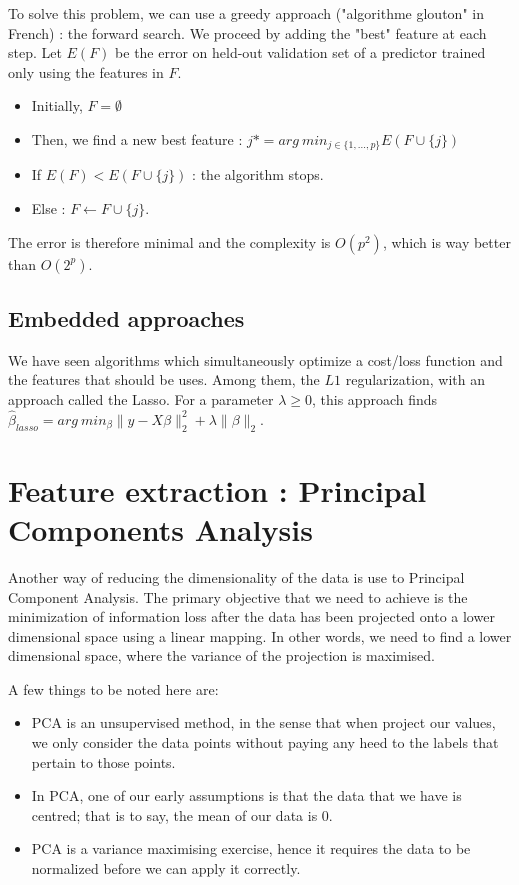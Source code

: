 \documentclass{article}
\begin{document}
To solve this problem, we can use a greedy approach ("algorithme glouton" in French) : the forward search.
We proceed  by adding the "best" feature at each step. Let $E(F)$ be the error on held-out validation set of a predictor trained only using the features in $F$.
\begin{itemize}

    \item Initially, $F = \emptyset $
    
    \item Then, we find a new best feature : $j*= arg \ min_{j \in \{1,...,p\}} E(F\cup \{j\})$
    
    \item If $E(F)<E(F \cup \{j\})$ : the algorithm stops.
    
    \item Else : $F \leftarrow F \cup \{j\}$.
    
\end{itemize}

The error is therefore minimal and the complexity is $O(p^2)$, which is way better than $O(2^p)$.


\subsection{Embedded approaches}
We have seen algorithms which simultaneously optimize a cost/loss function and the features that should be uses.
Among them, the $L1$ regularization, with an approach called the Lasso. For a parameter $\lambda \geq 0 $, this approach finds $\widehat{\beta}_{lasso} = arg \ min_{\beta} \| y-X\beta \|_{2}^{2} + \lambda \| \beta \|_2 $.

\section{Feature extraction : Principal Components Analysis}

Another way of reducing the dimensionality of the data is use to Principal Component Analysis. The primary objective that we need to achieve is the minimization of information loss after the data has been projected onto a lower dimensional space using a linear mapping. In other words, we need to find a lower dimensional space, where the variance of the projection is maximised.

\bigskip

A few things to be noted here are:
\begin{itemize}
    \item PCA is an unsupervised method, in the sense that when project our values, we only consider the data points without paying any heed to the labels that pertain to those points.
    \item In PCA, one of our early assumptions is that the data that we have is centred; that is to say, the mean of our data is 0.
    \item PCA is a variance maximising exercise, hence it requires the data to be normalized before we can apply it correctly.
\end{itemize}
\end{document}
